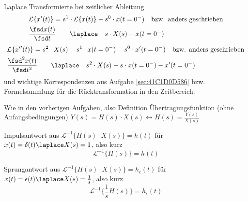 \begin{Werkzeug}
Laplace Transformierte bei zeitlicher Ableitung
\begin{align}
&\mathcal{L}\{x'(t)\}  = s^1 \cdot \mathcal{L}\{x(t)\} - s^0 \cdot x(t=0^-)\quad\text{bzw. anders geschrieben}\\
&\frac{\fsd x(t)}{\fsd t} \qquad \laplace \quad s \cdot X(s) - x(t=0^-)
\end{align}
%
\begin{align}
&\mathcal{L}\{x''(t)\} = s^2 \cdot X(s) - s^1 \cdot x(t=0^-) - s^0 \cdot x'(t=0^-)\quad\text{bzw. anders geschrieben}\\
&\frac{\fsd^2 x(t)}{\fsd t^2} \qquad \laplace \quad s^2 \cdot X(s) - s \cdot x(t=0^-) - x'(t=0^-)
\end{align}
und wichtige Korrespondenzen aus Aufgabe \ref{sec:41C1D0D586} bzw. Formelsammlung für die Rücktransformation in den Zeitbereich.
\end{Werkzeug}
\begin{Ansatz}
Wie in den vorherigen Aufgaben, also Definition Übertragungsfunktion (ohne Anfangsbedingungen)
$Y(s) = H(s) \cdot X(s) \leftrightarrow H(s) = \frac{Y(s)}{X(s)}$

Impulsantwort aus $\mathcal{L}^{-1}\{H(s) \cdot X(s)\} = h(t)$ für $x(t)=\delta(t) \laplace X(s)=1$, also kurz
$$\mathcal{L}^{-1}\{H(s)\} = h(t)$$

Sprungantwort aus $\mathcal{L}^{-1}\{H(s) \cdot X(s)\} = h_\epsilon(t)$ für $x(t)=\epsilon(t) \laplace X(s)=\frac{1}{s}$, also kurz
$$\mathcal{L}^{-1}\{\frac{1}{s} H(s)\} = h_\epsilon(t)$$
\end{Ansatz}
